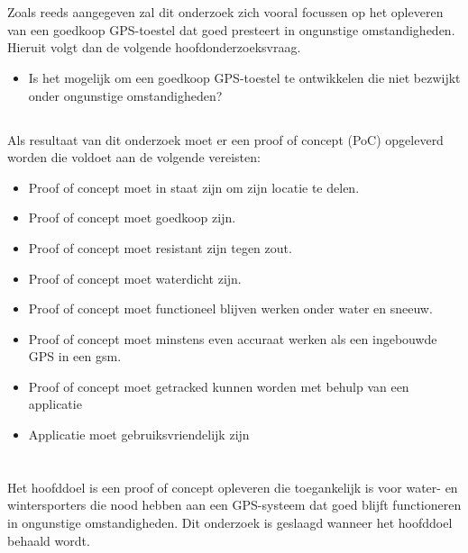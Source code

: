 \section{}
\subsection{}
\label{sec:onderzoeksvraag}

Zoals reeds aangegeven zal dit onderzoek zich vooral focussen op het opleveren van een goedkoop GPS-toestel dat goed presteert in ongunstige omstandigheden. Hieruit volgt dan de volgende hoofdonderzoeksvraag.
\newline
\begin{itemize}
	\item Is het mogelijk om een goedkoop GPS-toestel te ontwikkelen die niet bezwijkt onder ongunstige omstandigheden?
\end{itemize}

\subsection{}
Als resultaat van dit onderzoek moet er een proof of concept (PoC) opgeleverd worden die voldoet aan de volgende vereisten:
\begin{itemize}
	\item Proof of concept moet in staat zijn om zijn locatie te delen.
	\item Proof of concept moet goedkoop zijn.
	\item Proof of concept moet resistant zijn tegen zout.
	\item Proof of concept moet waterdicht zijn.
    \item Proof of concept moet functioneel blijven werken  onder water en sneeuw.
	\item Proof of concept moet minstens even accuraat werken als een ingebouwde GPS in een gsm.
	\item Proof of concept moet getracked kunnen worden met behulp van een applicatie
	\item Applicatie moet gebruiksvriendelijk zijn
\end{itemize}

\section{}
\label{sec:onderzoeksdoelstelling}
Het hoofddoel is een proof of concept opleveren die toegankelijk is voor water- en wintersporters die nood hebben aan een GPS-systeem dat goed blijft functioneren in ongunstige omstandigheden. Dit onderzoek is geslaagd wanneer het hoofddoel behaald wordt.


